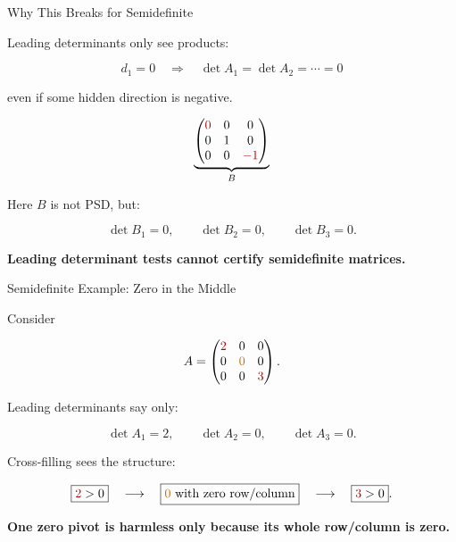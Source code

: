 \documentclass[10pt]{beamer}
\theoremstyle{definition}
\newcommand{\x}[1]{\alert{\textbf{#1}}}
\newcommand{\rd}[1]{{\color{red!70!black}#1}}
\newcommand{\ora}[1]{{\color{orange!80!black}#1}}
\begin{document}
\begin{frame}[shrink=5]{Why This Breaks for Semidefinite}

Leading determinants only see products:

$$
d_1=0
\quad\Longrightarrow\quad
\det A_1=\det A_2=\cdots=0
$$

even if some hidden direction is negative.

\vfill

\[
\underbrace{
\begin{pmatrix}
\rd{0}&0&0\\
0&1&0\\
0&0&\rd{-1}
\end{pmatrix}}_{B}
\]

\vspace{0.1cm}

Here $B$ is not PSD, but:

$$
\det B_1=0,\qquad \det B_2=0,\qquad \det B_3=0.
$$

\begin{center}
\x{Leading determinant tests cannot certify semidefinite matrices.}
\end{center}

\end{frame}


\begin{frame}[shrink=5]{Semidefinite Example: Zero in the Middle}

Consider

\[
A=
\begin{pmatrix}
\rd{2}&0&0\\
0&\ora{0}&0\\
0&0&\rd{3}
\end{pmatrix}.
\]

\vfill

Leading determinants say only:

$$
\det A_1=2,\qquad \det A_2=0,\qquad \det A_3=0.
$$

\vfill

Cross-filling sees the structure:

$$
\boxed{\rd{2}>0}
\quad\longrightarrow\quad
\boxed{\ora{0}\text{ with zero row/column}}
\quad\longrightarrow\quad
\boxed{\rd{3}>0}.
$$

\vfill

\begin{center}
\x{One zero pivot is harmless only because its whole row/column is zero.}
\end{center}

\end{frame}
\end{document}
